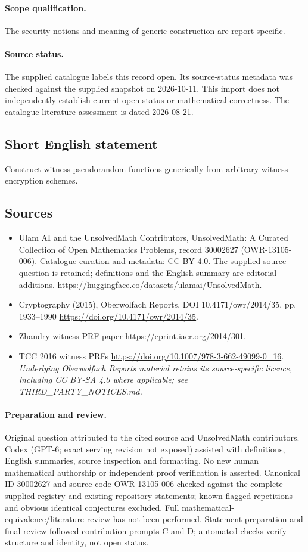 \documentclass[11pt]{article}
\begin{document}
\paragraph{Scope qualification.}
The security notions and meaning of generic construction are report-specific.
\paragraph{Source status.}
The supplied catalogue labels this record open. Its source-status metadata was checked against the supplied snapshot on 2026-10-11. This import does not independently establish current open status or mathematical correctness. The catalogue literature assessment is dated 2026-08-21.
\subsection{Short English statement}
Construct witness pseudorandom functions generically from arbitrary witness-encryption schemes.
\subsection{Sources}
\begin{itemize}
\item[S1] Ulam AI and the UnsolvedMath Contributors, UnsolvedMath: A Curated Collection of Open Mathematics Problems, record 30002627 (OWR-13105-006). Catalogue curation and metadata: CC BY 4.0. The supplied source question is retained; definitions and the English summary are editorial additions.
\url{https://huggingface.co/datasets/ulamai/UnsolvedMath}.
\item[S2] Cryptography (2015), Oberwolfach Reports, DOI 10.4171/owr/2014/35, pp. 1933--1990
\url{https://doi.org/10.4171/owr/2014/35}.
\item[S3] Zhandry witness PRF paper
\url{https://eprint.iacr.org/2014/301}.
\item[S4] TCC 2016 witness PRFs
\url{https://doi.org/10.1007/978-3-662-49099-0_16}.
\textit{Underlying Oberwolfach Reports material retains its source-specific licence, including CC BY-SA 4.0 where applicable; see THIRD\_PARTY\_NOTICES.md.}
\end{itemize}
\paragraph{Preparation and review.}
Original question attributed to the cited source and UnsolvedMath contributors. Codex (GPT-6; exact serving revision not exposed) assisted with definitions, English summaries, source inspection and formatting. No new human mathematical authorship or independent proof verification is asserted. Canonical ID 30002627 and source code OWR-13105-006 checked against the complete supplied registry and existing repository statements; known flagged repetitions and obvious identical conjectures excluded. Full mathematical-equivalence/literature review has not been performed. Statement preparation and final review followed contribution prompts C and D; automated checks verify structure and identity, not open status.
\label{end:30002627}
\end{document}
